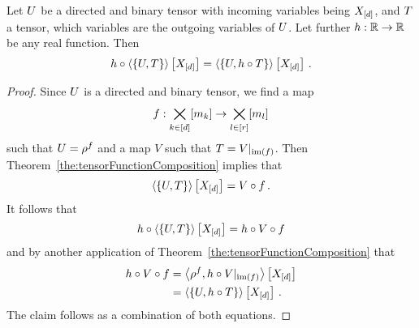 \begin{corollary}\label{cor:directedTrafo}
	Let $U$ be a directed and binary tensor with incoming variables being $X_{[d]}$, and $T$ a tensor, which variables are the outgoing variables of $U$.
	Let further $h:\mathbb{R}\rightarrow\mathbb{R}$ be any real function.
	Then
		\[ h \circ \left\langle \{U,T\}\right\rangle \left[ X_{[d]} \right] 
		= \left\langle \{U,h\circ T\}\right\rangle \left[ X_{[d]} \right] \, . \]
\end{corollary}
\begin{proof}
	Since $U$ is a directed and binary tensor, we find a map
		\[ f : \bigtimes_{k\in[d]}[m_{k}] \rightarrow \bigtimes_{l\in[r]}[m_{l}] \]
	such that $U=\rho^{f}$ and a map $V$ such that $T={V}|_{\mathrm{im}\left(f\right)}$.
	Then Theorem~\ref{the:tensorFunctionComposition} implies that 
		\[ \left\langle \{U,T\}\right\rangle \left[ X_{[d]} \right] = V \circ f \, . \]
	It follows that 
	\begin{align*}
		h \circ \left\langle \{U,T\}\right\rangle \left[ X_{[d]} \right] = h \circ V \circ f 
	\end{align*}
	and by another application of Theorem~\ref{the:tensorFunctionComposition} that
	\begin{align*}
		h \circ V \circ f
		& = \left\langle \rho^{f}, {h \circ V}|_{\mathrm{im}\left(f\right)}\right\rangle \left[ X_{[d]} \right] \\
		& = \left\langle \{U,h\circ T\}\right\rangle \left[ X_{[d]} \right] \, . 
	\end{align*}
	The claim follows as a combination of both equations.
\end{proof}



